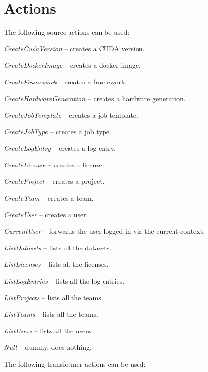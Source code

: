 \documentclass[a4paper]{book}
\begin{document}
\section{Actions}
The following source actions can be used:
\begin{tight_itemize}
  \item \textit{CreateCudaVersion} -- creates a CUDA version.
  \item \textit{CreateDockerImage} -- creates a docker image.
  \item \textit{CreateFramework} -- creates a framework.
  \item \textit{CreateHardwareGeneration} -- creates a hardware generation.
  \item \textit{CreateJobTemplate} -- creates a job template.
  \item \textit{CreateJobType} -- creates a job type.
  \item \textit{CreateLogEntry} -- creates a log entry.
  \item \textit{CreateLicense} -- creates a license.
  \item \textit{CreateProject} -- creates a project.
  \item \textit{CreateTeam} -- creates a team.
  \item \textit{CreateUser} -- creates a user.
  \item \textit{CurrentUser} -- forwards the user logged in via the current context.
  \item \textit{ListDatasets} -- lists all the datasets.
  \item \textit{ListLicenses} -- lists all the licenses.
  \item \textit{ListLogEntries} -- lists all the log entries.
  \item \textit{ListProjects} -- lists all the teams.
  \item \textit{ListTeams} -- lists all the teams.
  \item \textit{ListUsers} -- lists all the users.
  \item \textit{Null} -- dummy, does nothing.
\end{tight_itemize}
The following transformer actions can be used:
\end{document}
